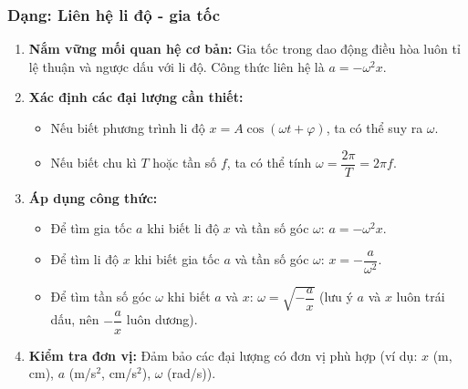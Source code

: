 \subsubsection{Dạng: Liên hệ li độ - gia tốc}
\begin{phuongphap}
\begin{enumerate}
    \item \textbf{Nắm vững mối quan hệ cơ bản:} Gia tốc trong dao động điều hòa luôn tỉ lệ thuận và ngược dấu với li độ. Công thức liên hệ là $a = -\omega^2 x$.
    \item \textbf{Xác định các đại lượng cần thiết:}
    \begin{itemize}
        \item Nếu biết phương trình li độ $x = A\cos(\omega t + \varphi)$, ta có thể suy ra $\omega$.
        \item Nếu biết chu kì $T$ hoặc tần số $f$, ta có thể tính $\omega = \dfrac{2\pi}{T} = 2\pi f$.
    \end{itemize}
    \item \textbf{Áp dụng công thức:}
    \begin{itemize}
        \item Để tìm gia tốc $a$ khi biết li độ $x$ và tần số góc $\omega$: $a = -\omega^2 x$.
        \item Để tìm li độ $x$ khi biết gia tốc $a$ và tần số góc $\omega$: $x = -\dfrac{a}{\omega^2}$.
        \item Để tìm tần số góc $\omega$ khi biết $a$ và $x$: $\omega = \sqrt{-\dfrac{a}{x}}$ (lưu ý $a$ và $x$ luôn trái dấu, nên $-\dfrac{a}{x}$ luôn dương).
    \end{itemize}
    \item \textbf{Kiểm tra đơn vị:} Đảm bảo các đại lượng có đơn vị phù hợp (ví dụ: $x$ (m, cm), $a$ (m/s$^2$, cm/s$^2$), $\omega$ (rad/s)).
\end{enumerate}
\end{phuongphap}
